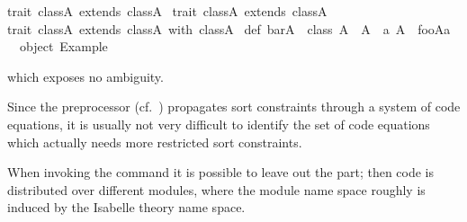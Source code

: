 \begin{isabellebody}
\begin{isamarkuptext}
\isanewline
trait\ class{}{}A{}\ extends\ class{}{}A{}\ {}\isanewline
{}\isanewline
\isanewline
trait\ class{}{}A{}\ extends\ class{}{}A{}\ {}\isanewline
{}\isanewline
\isanewline
trait\ class{}{}A{}\ extends\ class{}{}A{}\ with\ class{}{}A{}\ {}\isanewline
{}\isanewline
\isanewline
def\ bar{}A\ {}\ class{}{}{}\ A\ {}{}\ A\ {}\ {}a{}\ A{}\ {}{}\ foo{}A{}{}a{}\isanewline
\isanewline
{}\ {}{}\ object\ Example\ {}{}\isanewline%
\end{isamarkuptext}%
\isamarkuptrue%
%
\endisatagquotetypewriter
{\isafoldquotetypewriter}%
%
\isadelimquotetypewriter
%
\endisadelimquotetypewriter
%
\begin{isamarkuptext}%
\noindent which exposes no ambiguity.

  Since the preprocessor (cf.~) propagates sort
  constraints through a system of code equations, it is usually not
  very difficult to identify the set of code equations which actually
  needs more restricted sort constraints.%
\end{isamarkuptext}%
\isamarkuptrue%
%
\isamarkuptrue%
%
\begin{isamarkuptext}%
When invoking the \hyperlink{command.export-code}{\mbox{}} command it is possible to
  leave out the \hyperlink{keyword.module-name}{\mbox{}} part; then code is
  distributed over different modules, where the module name space
  roughly is induced by the Isabelle theory name space.


\end{isamarkuptext}
\end{isabellebody}
